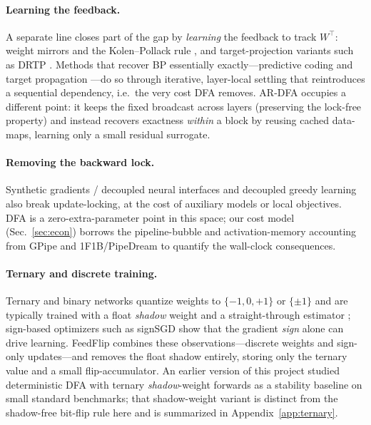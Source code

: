 \documentclass[11pt]{article}
\newcommand{\ARDFA}{\textsc{AR-DFA}}
\begin{document}
\paragraph{Learning the feedback.} A separate line closes part of the gap by \emph{learning} the feedback to track $W^\top$: weight mirrors and the Kolen--Pollack rule \citep{akrout2019deep}, and target-projection variants such as DRTP \citep{frenkel2021learning}. Methods that recover BP essentially exactly---predictive coding and target propagation \citep{whittington2017approximation}---do so through iterative, layer-local settling that reintroduces a sequential dependency, i.e.\ the very cost DFA removes. \ARDFA{} occupies a different point: it keeps the fixed broadcast across layers (preserving the lock-free property) and instead recovers exactness \emph{within} a block by reusing cached data-maps, learning only a small residual surrogate.

\paragraph{Removing the backward lock.} Synthetic gradients / decoupled neural interfaces \citep{jaderberg2017decoupled} and decoupled greedy learning also break update-locking, at the cost of auxiliary models or local objectives. DFA is a zero-extra-parameter point in this space; our cost model (Sec.~\ref{sec:econ}) borrows the pipeline-bubble and activation-memory accounting from GPipe and 1F1B/PipeDream \citep{huang2019gpipe,narayanan2019pipedream} to quantify the wall-clock consequences.

\paragraph{Ternary and discrete training.} Ternary and binary networks quantize weights to $\{-1,0,+1\}$ or $\{\pm1\}$ and are typically trained with a float \emph{shadow} weight and a straight-through estimator \citep{courbariaux2015binaryconnect,li2016twn}; sign-based optimizers such as signSGD \citep{bernstein2018signsgd} show that the gradient \emph{sign} alone can drive learning. FeedFlip combines these observations---discrete weights and sign-only updates---and removes the float shadow entirely, storing only the ternary value and a small flip-accumulator. An earlier version of this project studied deterministic DFA with ternary \emph{shadow}-weight forwards as a stability baseline on small standard benchmarks; that shadow-weight variant is distinct from the shadow-free bit-flip rule here and is summarized in Appendix~\ref{app:ternary}.
\end{document}
